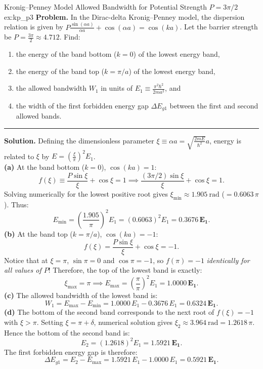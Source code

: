 \documentclass[11pt,a4paper]{article}
\newcommand{\hb}{\hbar}
\begin{document}
\begin{examplebox}{Kronig--Penney Model Allowed Bandwidth for Potential Strength $P = 3\pi/2$}{ex:kp_p3}
\textbf{Problem.} In the Dirac-delta Kronig--Penney model, the dispersion relation is given by $P\frac{\sin(\alpha a)}{\alpha a} + \cos(\alpha a) = \cos(ka)$. Let the barrier strength be $P = \frac{3\pi}{2} \approx 4.712$. Find:
\begin{enumerate}[noitemsep]
    \item the energy of the band bottom ($k = 0$) of the lowest energy band,
    \item the energy of the band top ($k = \pi/a$) of the lowest energy band,
    \item the allowed bandwidth $W_1$ in units of $E_1 \equiv \frac{\pi^2\hb^2}{2ma^2}$, and
    \item the width of the first forbidden energy gap $\Delta E_{g1}$ between the first and second allowed bands.
\end{enumerate}
\vspace{0.2cm}\hrule\vspace{0.2cm}
\textbf{Solution.}
Defining the dimensionless parameter $\xi \equiv \alpha a = \sqrt{\frac{2mE}{\hb^2}}a$, energy is related to $\xi$ by $E = \left(\frac{\xi}{\pi}\right)^2 E_1$.\\
\textbf{(a)} At the band bottom ($k = 0$), $\cos(ka) = 1$:
\[
    f(\xi) \equiv \frac{P\sin\xi}{\xi} + \cos\xi = 1 \implies \frac{(3\pi/2)\sin\xi}{\xi} + \cos\xi = 1.
\]
Solving numerically for the lowest positive root gives $\xi_{\min} \approx \mathbf{1.905\ \mathrm{rad}}$ ($= 0.6063\,\pi$). Thus:
\[
    E_{\min} = \left(\frac{1.905}{\pi}\right)^2 E_1 = (0.6063)^2 E_1 = \mathbf{0.3676\,E_1}.
\]
\textbf{(b)} At the band top ($k = \pi/a$), $\cos(ka) = -1$:
\[
    f(\xi) = \frac{P\sin\xi}{\xi} + \cos\xi = -1.
\]
Notice that at $\xi = \pi$, $\sin\pi = 0$ and $\cos\pi = -1$, so $f(\pi) = -1$ \emph{identically for all values of $P$}! Therefore, the top of the lowest band is exactly:
\[
    \xi_{\max} = \pi \implies E_{\max} = \left(\frac{\pi}{\pi}\right)^2 E_1 = \mathbf{1.0000\,E_1}.
\]
\textbf{(c)} The allowed bandwidth of the lowest band is:
\[
    W_1 = E_{\max} - E_{\min} = 1.0000\,E_1 - 0.3676\,E_1 = \mathbf{0.6324\,E_1}.
\]
\textbf{(d)} The bottom of the second band corresponds to the next root of $f(\xi) = -1$ with $\xi > \pi$. Setting $\xi = \pi + \delta$, numerical solution gives $\xi_2 \approx \mathbf{3.964\ \mathrm{rad}} = 1.2618\,\pi$. Hence the bottom of the second band is:
\[
    E_2 = (1.2618)^2 E_1 = \mathbf{1.5921\,E_1}.
\]
The first forbidden energy gap is therefore:
\[
    \Delta E_{g1} = E_2 - E_{\max} = 1.5921\,E_1 - 1.0000\,E_1 = \mathbf{0.5921\,E_1}.
\]
\end{examplebox}
\end{document}
